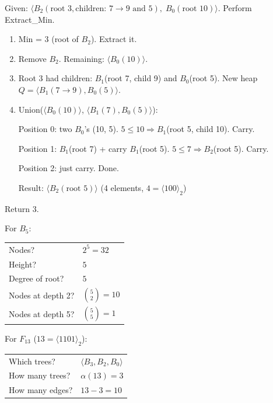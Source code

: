 \documentclass[11pt]{article}
\begin{document}
\begin{examplebox}
Given: $\langle B_2(\text{root } 3, \text{children: } 7 \to 9 \text{ and } 5),\; B_0(\text{root } 10) \rangle$. Perform Extract\_Min.

\begin{answerband}
\begin{enumerate}[leftmargin=1.4em,itemsep=2pt]
  \item Min = 3 (root of $B_2$). Extract it.
  \item Remove $B_2$. Remaining: $\langle B_0(10) \rangle$.
  \item Root 3 had children: $B_1$(root 7, child 9) and $B_0$(root 5). New heap $Q = \langle B_1(7 \to 9), B_0(5) \rangle$.
  \item Union($\langle B_0(10) \rangle$, $\langle B_1(7), B_0(5) \rangle$):

  Position 0: two $B_0$'s (10, 5). $5 \le 10 \Rightarrow B_1$(root 5, child 10). Carry.

  Position 1: $B_1$(root 7) + carry $B_1$(root 5). $5 \le 7 \Rightarrow B_2$(root 5). Carry.

  Position 2: just carry. Done.

  Result: $\langle B_2(\text{root } 5) \rangle$ (4 elements, $4 = \langle 100 \rangle_2$) \checkmark
\end{enumerate}

Return 3.
\end{answerband}
\end{examplebox}

\begin{examplebox}
For $B_5$:

\begin{center}
\renewcommand{\arraystretch}{1.3}
\begin{tabular}{l l}
Nodes? & \textcolor{violetT}{$2^5 = 32$} \\
Height? & \textcolor{violetT}{$5$} \\
Degree of root? & \textcolor{violetT}{$5$} \\
Nodes at depth 2? & \textcolor{violetT}{$\binom{5}{2} = 10$} \\
Nodes at depth 5? & \textcolor{violetT}{$\binom{5}{5} = 1$} \\
\end{tabular}
\end{center}

For $F_{13}$ ($13 = \langle 1101 \rangle_2$):

\begin{center}
\renewcommand{\arraystretch}{1.3}
\begin{tabular}{l l}
Which trees? & \textcolor{violetT}{$\langle B_3, B_2, B_0 \rangle$} \\
How many trees? & \textcolor{violetT}{$\alpha(13) = 3$} \\
How many edges? & \textcolor{violetT}{$13 - 3 = 10$} \\
\end{tabular}
\end{center}
\end{examplebox}
\end{document}
